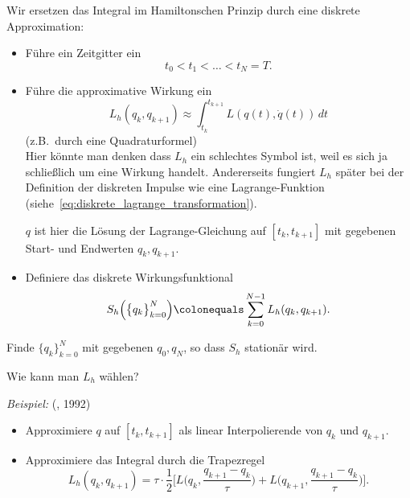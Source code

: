 Wir ersetzen das Integral im Hamiltonschen Prinzip durch eine diskrete Approximation:

\medskip

\begin{itemize}
	\item Führe ein Zeitgitter ein
	\begin{equation*}
	t_0<t_1<\hdots < t_N = T.
	\end{equation*}
	\item  Führe die approximative Wirkung ein
	\begin{equation*}
		L_h(q_k,q_{k+1})\approx \int_{t_k}^{t_{k+1}} L(q(t),\dot q(t))\,dt
	\end{equation*}
	(z.B.\ durch eine Quadraturformel)\\

	Hier könnte man denken dass $L_h$ ein schlechtes Symbol ist, weil es sich ja schließlich
	um eine Wirkung handelt.  Andererseits fungiert $L_h$ später bei der Definition der
	diskreten Impulse wie eine Lagrange-Funktion (siehe~\eqref{eq:diskrete_lagrange_transformation}).

	$q$ ist hier die Lösung der Lagrange-Gleichung auf $[t_k,t_{k+1}]$ mit gegebenen Start- und Endwerten $q_k,q_{k+1}$.
	\item Definiere das diskrete Wirkungsfunktional
	\begin{equation*}
		S_h\Big(\big\{q_k\big\}_{k=0}^N\Big) \colonequals \sum_{k=0}^{N-1} L_h(q_k,q_{k+1}).
	\end{equation*}
\end{itemize}

\begin{definition}
Finde $\{q_k\}^N_{k=0}$  mit gegebenen $q_0, q_N$, so dass $S_h$ stationär wird.
\end{definition}

\medskip

Wie kann man $L_h$ wählen?

\medskip

\emph{Beispiel:} (\citet{mackay:1992}, 1992)
\begin{itemize}
\item Approximiere $q$ auf $[t_k, t_{k+1}]$ als linear Interpolierende von $q_k$ und $q_{k+1}$.
\item Approximiere das Integral durch die Trapezregel
\begin{equation*}
L_h(q_k, q_{k+1})
=
\tau \cdot \frac{1}{2} \Big[L\Big(q_k, \frac{q_{k+1} - q_k}{\tau}\Big) +  L\Big(q_{k+1}, \frac{q_{k+1} - q_k}{\tau}\Big)\Big].
\end{equation*}
\end{itemize}

